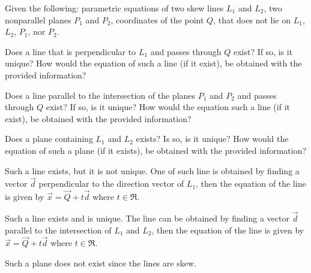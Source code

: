 
\begin{Exercise}[
name={},
title={}, 
difficulty=0,
origin={\cite{MB}}]
Given the following: parametric equations of two skew lines $L_1$ and $L_2$, two nonparallel planes $P_1$ and $P_2$, coordinates of the point $Q$, that does not lie on $L_1$, $L_2$, $P_1$, nor $P_2$. 

\Question Does a line that is perpendicular to $L_1$ and passes through $Q$ exist?
If so, is it unique? How would the equation of such a line (if it exist), be obtained with the provided information?

\Question Does a line parallel to the intersection of the planes $P_1$ and $P_2$ and passes through $Q$ exist? If so, is it unique?
How would the equation such a line (if it exist), be obtained with the provided information?

\Question Does a plane containing $L_1$ and $L_2$ exists? Is so, is it unique? How would the equation of such a plane (if it exists), be obtained with the provided information?
\end{Exercise}

\begin{Answer}
\Question Such a line exists, but it is not unique.  One of such line is obtained by finding a vector $\vec{d}$ perpendicular to the direction vector of $L_1$, then the equation of the line is given by $\vec{x}=\vec{Q}+t\vec{d}$ where $t\in\Re$.

\Question Such a line exists and is unique.  The line can be obtained by finding a vector $\vec{d}$ parallel to the intersection of $L_1$ and $L_2$, then the equation of the line is given by $\vec{x}=\vec{Q}+t\vec{d}$ where $
t\in\Re$.

\Question Such a plane does not exist since the lines are skew.
\end{Answer}
